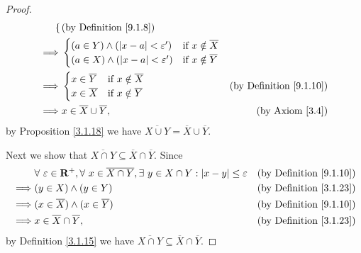 \begin{proof}
\begin{align*}
\begin{cases}
        \end{cases}                                                                                                         & \text{(by Definition \ref{9.1.8})}  \\
        \implies & \begin{cases}
            (a \in Y) \land (\abs*{x - a} < \varepsilon') & \text{if } x \notin \overline{X} \\
            (a \in X) \land (\abs*{x - a} < \varepsilon') & \text{if } x \notin \overline{Y}
        \end{cases}                                                                                                                                               \\
        \implies & \begin{cases}
            x \in \overline{Y} & \text{if } x \notin \overline{X} \\
            x \in \overline{X} & \text{if } x \notin \overline{Y}
        \end{cases}                                                                                                         & \text{(by Definition \ref{9.1.10})} \\
        \implies & x \in \overline{X} \cup \overline{Y},                                                                                              & \text{(by Axiom \ref{3.4})}
    \end{align*}
    by Proposition \ref{3.1.18} we have \(\overline{X \cup Y} = \overline{X} \cup \overline{Y}\).

    Next we show that \(\overline{X \cap Y} \subseteq \overline{X} \cap \overline{Y}\).
    Since
    \begin{align*}
                 & \forall\ \varepsilon \in \mathbf{R}^+, \forall\ x \in \overline{X \cap Y}, \exists\ y \in X \cap Y : \abs*{x - y} \leq \varepsilon & \text{(by Definition \ref{9.1.10})} \\
        \implies & (y \in X) \land (y \in Y)                                                                                                          & \text{(by Definition \ref{3.1.23})} \\
        \implies & (x \in \overline{X}) \land (x \in \overline{Y})                                                                                    & \text{(by Definition \ref{9.1.10})} \\
        \implies & x \in \overline{X} \cap \overline{Y},                                                                                              & \text{(by Definition \ref{3.1.23})}
    \end{align*}
    by Definition \ref{3.1.15} we have \(\overline{X \cap Y} \subseteq \overline{X} \cap \overline{Y}\).


\end{proof}
